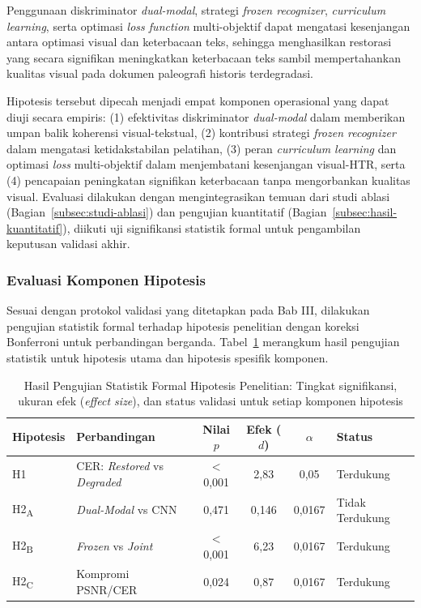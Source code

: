 Penggunaan diskriminator \textit{dual-modal}, strategi \textit{frozen recognizer}, \textit{curriculum learning}, serta optimasi \textit{loss function} multi-objektif dapat mengatasi kesenjangan antara optimasi visual dan keterbacaan teks, sehingga menghasilkan restorasi yang secara signifikan meningkatkan keterbacaan teks sambil mempertahankan kualitas visual pada dokumen paleografi historis terdegradasi.

Hipotesis tersebut dipecah menjadi empat komponen operasional yang dapat diuji secara empiris: (1) efektivitas diskriminator \textit{dual-modal} dalam memberikan umpan balik koherensi visual-tekstual, (2) kontribusi strategi \textit{frozen recognizer} dalam mengatasi ketidakstabilan pelatihan, (3) peran \textit{curriculum learning} dan optimasi \textit{loss} multi-objektif dalam menjembatani kesenjangan visual-HTR, serta (4) pencapaian peningkatan signifikan keterbacaan tanpa mengorbankan kualitas visual. Evaluasi dilakukan dengan mengintegrasikan temuan dari studi ablasi (Bagian~\ref{subsec:studi-ablasi}) dan pengujian kuantitatif (Bagian~\ref{subsec:hasil-kuantitatif}), diikuti uji signifikansi statistik formal untuk pengambilan keputusan validasi akhir.

\subsubsection{Evaluasi Komponen Hipotesis}
\label{subsubsec:evaluasi-komponen-hipotesis}

Sesuai dengan protokol validasi yang ditetapkan pada Bab III, dilakukan pengujian statistik formal terhadap hipotesis penelitian dengan koreksi Bonferroni untuk perbandingan berganda. Tabel~\ref{tab:hypothesis-validation} merangkum hasil pengujian statistik untuk hipotesis utama dan hipotesis spesifik komponen.

\begin{table}[!htbp]
    \caption[Hasil pengujian statistik formal hipotesis penelitian]{Hasil Pengujian Statistik Formal Hipotesis Penelitian: Tingkat signifikansi, ukuran efek (\textit{effect size}), dan status validasi untuk setiap komponen hipotesis}
    \label{tab:hypothesis-validation}
    \small
    \begin{tabular}{|l|p{3.2cm}|c|c|c|p{2.5cm}|}
        \hline
        \textbf{Hipotesis} & \textbf{Perbandingan} & \textbf{Nilai $p$} & \textbf{Efek ($d$)} & \textbf{$\alpha$} & \textbf{Status} \\
        \hline
        H1 & CER: \textit{Restored} vs \textit{Degraded} & $<$0,001 & 2,83 & 0,05 & Terdukung \\
        H2\textsubscript{A} & \textit{Dual-Modal} vs CNN & 0,471 & 0,146 & 0,0167 & Tidak Terdukung \\
        H2\textsubscript{B} & \textit{Frozen} vs \textit{Joint} & $<$0,001 & 6,23 & 0,0167 & Terdukung \\
        H2\textsubscript{C} & Kompromi PSNR/CER & 0,024 & 0,87 & 0,0167 & Terdukung \\
        \hline
    \end{tabular}
\end{table}

